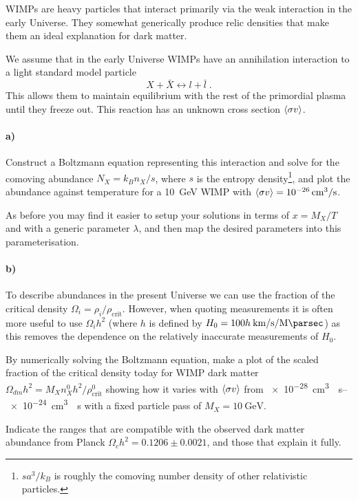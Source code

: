 \documentclass[12pt]{article}
\begin{document}
WIMPs are heavy particles that interact primarily via the weak interaction in the early Universe. They somewhat generically produce relic densities that make them an ideal explanation for dark matter.

We assume that in the early Universe WIMPs have an annihilation interaction to a light standard model particle
\begin{equation}
    X + \bar{X} \leftrightarrow l + \bar{l} \; .
\end{equation}
This allows them to maintain equilibrium with the rest of the primordial plasma until they freeze out. This reaction has an unknown cross section $\langle \sigma v \rangle$.

\paragraph{a)} Construct a Boltzmann equation representing this interaction and solve for the comoving abundance $N_X = k_B n_X / s$, where $s$ is the entropy density\footnote{$s a^3 / k_B$ is roughly the comoving number density of other relativistic particles.}, and plot the abundance against temperature for a \SI{10}{\GeV} WIMP with $\langle \sigma v \rangle = \SI{e-26}{\centi\metre^3\per\second}$.

As before you may find it easier to setup your solutions in terms of $x = M_X / T$ and with a generic parameter $\lambda$, and then map the desired parameters into this parameterisation.

\paragraph{b)} To describe abundances in the present Universe we can use the fraction of the critical density $\Omega_i = \rho_i / \rho_\text{crit}$. However, when quoting measurements it is often more useful to use $\Omega_i h^2$ (where $h$ is defined by $H_0 = 100 h\: \si{\kilo\metre\per\second\per\mega\parsec}$) as this removes the dependence on the relatively inaccurate measurements of $H_0$.

By numerically solving the Boltzmann equation, make a plot of the scaled fraction of the critical density today for WIMP dark matter $\Omega_{dm} h^2 = M_X n_X^0 h^2 / \rho_\text{crit}^0$ showing how it varies with $\langle \sigma v \rangle$ from \SIrange{e-28}{e-24}{\centi\metre^3 \per\second} with a fixed particle pass of $M_X = \SI{10}{\GeV}$.

Indicate the ranges that are compatible with the observed dark matter abundance from Planck $\Omega_c h^2 = 0.1206 \pm 0.0021$, and those that explain it fully.
\end{document}
